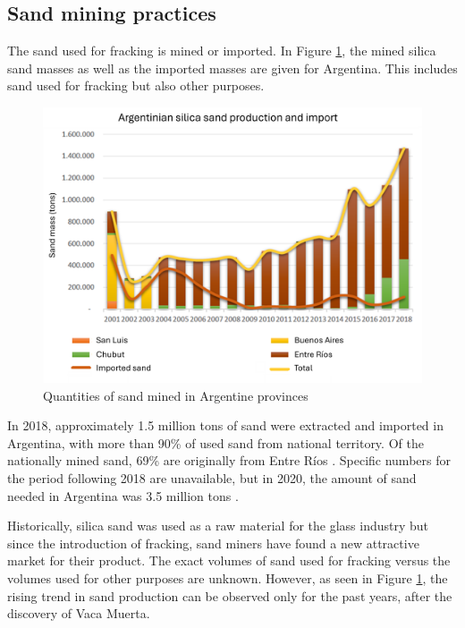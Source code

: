 \subsection{Sand mining practices}
The sand used for fracking is mined or imported. In Figure \ref{fig:sanddiagram}, the mined silica sand masses as well as the imported masses are given for Argentina. This includes sand used for fracking but also other purposes.

\begin{figure}[H]
    \centering
    \includegraphics[width=1\linewidth]{figures/ch9/Sandgraphquantities.png}
    \caption{Quantities of sand mined in Argentine provinces \autocite{secretariadepoliticamineraArenasParaFracking2019}}
    \label{fig:sanddiagram}
\end{figure}

In 2018, approximately 1.5 million tons of sand were extracted and imported in Argentina, with more than 90\% of used sand from national territory. Of the nationally mined sand, 69\% are originally from Entre Ríos \autocite{secretariadepoliticamineraArenasParaFracking2019}. Specific numbers for the period following 2018 are unavailable, but in 2020, the amount of sand needed in Argentina was 3.5 million tons \autocite{novasImpactoAmbientalOculto2022}.

Historically, silica sand was used as a raw material for the glass industry but since the introduction of fracking, sand miners have found a new attractive market for their product. The exact volumes of sand used for fracking versus the volumes used for other purposes are unknown. However, as seen in Figure \ref{fig:sanddiagram}, the rising trend in sand production can be observed only for the past years, after the discovery of Vaca Muerta.

